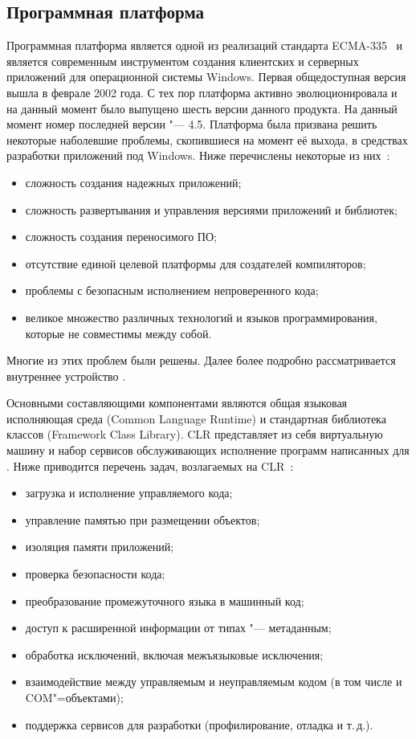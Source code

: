 \subsection{Программная платформа \dotnet}
\label{sub:practice:microsoft_net}
Программная платформа \dotnet{} является одной из реализаций стандарта ECMA-335~\cite{ecma_335} и является современным инструментом создания клиентских и серверных приложений для операционной системы Windows.
Первая общедоступная версия \netfx{} вышла в феврале 2002 года.
С тех пор платформа активно эволюционировала и на данный момент было выпущено шесть версии данного продукта.
На данный момент номер последней версии \netfx{} "--- 4.5.
Платформа \dotnet{} была призвана решить некоторые наболевшие проблемы, скопившиеся на момент её выхода, в средствах разработки приложений под Windows. 
Ниже перечислены некоторые из них~\cite[с.~\,--\,]{richter_2007_ru}:
\begin{itemize}
  \item сложность создания надежных приложений;
  \item сложность развертывания и управления версиями приложений и библиотек;
  \item сложность создания переносимого ПО;
  \item отсутствие единой целевой платформы для создателей компиляторов;
  \item проблемы с безопасным исполнением непроверенного кода;
  \item великое множество различных технологий и языков программирования, которые не совместимы между собой.
\end{itemize}

Многие из этих проблем были решены.
Далее более подробно рассматривается внутреннее устройство \dotnet{}.

Основными составляющими компонентами \dotnet{} являются общая языковая исполняющая среда (Common Language Runtime) и стандартная библиотека классов (Framework Class Library).
CLR представляет из себя виртуальную машину и набор сервисов обслуживающих исполнение программ написанных для \dotnet{}.
Ниже приводится перечень задач, возлагаемых на CLR~\cite{marchenko_2007}:
\begin{itemize}
  \item загрузка и исполнение управляемого кода;
  \item управление памятью при размещении объектов;
  \item изоляция памяти приложений;
  \item проверка безопасности кода;
  \item преобразование промежуточного языка в машинный код;
  \item доступ к расширенной информации от типах "--- метаданным;
  \item обработка исключений, включая межъязыковые исключения;
  \item взаимодействие между управляемым и неуправляемым кодом (в том числе и COM"=объектами);
  \item поддержка сервисов для разработки (профилирование, отладка и т.\,д.).
\end{itemize}

